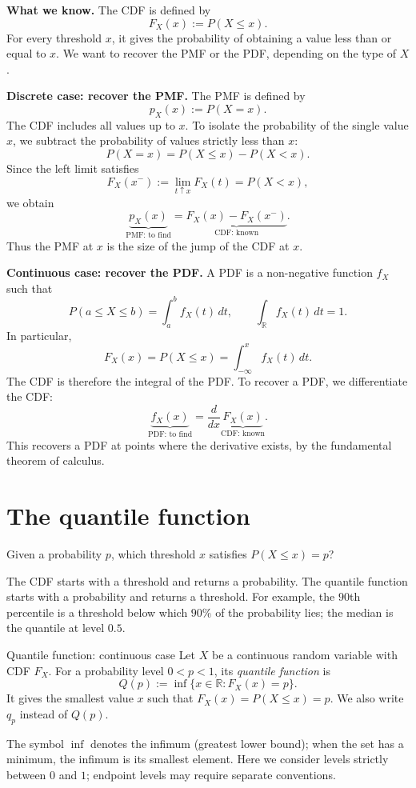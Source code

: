 \documentclass[a4paper,12pt,oneside]{report}
\begin{document}
\textbf{What we know.} The CDF is defined by
\[
  F_X(x):=P(X\leq x).
\]
For every threshold $x$, it gives the probability of obtaining a
value less than or equal to $x$. We want to recover the PMF or the
PDF, depending on the type of $X$.

\textbf{Discrete case: recover the PMF.}
The PMF is defined by
\[
  p_X(x):=P(X=x).
\]
The CDF includes all values up to $x$. To isolate the probability
of the single value $x$, we subtract the probability of values
strictly less than $x$:
\[
  P(X=x)=P(X\leq x)-P(X<x).
\]
Since the left limit satisfies
\[
  F_X(x^-):=\lim_{t\uparrow x}F_X(t)=P(X<x),
\]
we obtain
\[
  \boxed{\underbrace{p_X(x)}_{\text{PMF: to find}}
    =\underbrace{F_X(x)-F_X(x^-)}_{\text{CDF: known}}.}
\]
Thus the PMF at $x$ is the size of the jump of the CDF at $x$.

\label{rel:cdf-to-pdf}
\textbf{Continuous case: recover the PDF.}
A PDF is a non-negative function $f_X$ such that
\[
  P(a\leq X\leq b)=\int_a^b f_X(t)\,dt,
  \qquad \int_{\mathbb R}f_X(t)\,dt=1.
\]
In particular,
\[
  F_X(x)=P(X\leq x)=\int_{-\infty}^{x}f_X(t)\,dt.
\]
The CDF is therefore the integral of the PDF. To recover a PDF,
we differentiate the CDF:
\[
  \boxed{\underbrace{f_X(x)}_{\text{PDF: to find}}
    =\frac{d}{dx}\underbrace{F_X(x)}_{\text{CDF: known}}.}
\]
This recovers a PDF at points where the derivative exists, by the
fundamental theorem of calculus.

\clearpage
\section{The quantile function}
\begin{tcolorbox}[colback=blue!3,colframe=blue!30!black,
  boxrule=0.4pt,arc=1mm,title={What we are trying to answer},
  colbacktitle=blue!10,coltitle=black,fonttitle=\bfseries]
Given a probability $p$, which threshold $x$ satisfies
$P(X\leq x)=p$?
\end{tcolorbox}
The CDF starts with a threshold and returns a probability. The
quantile function starts with a probability and returns a threshold.
For example, the $90$th percentile is a threshold below which
$90\%$ of the probability lies; the median is the quantile at level $0.5$.

\begin{frameddefn}{Quantile function: continuous case}
\label{def:quantile-continuous}
Let $X$ be a continuous random variable with CDF $F_X$. For a
probability level $0<p<1$, its \emph{quantile function} is
\[
  Q(p):=\inf\{x\in\mathbb R:F_X(x)=p\}.
\]
It gives the smallest value $x$ such that $F_X(x)=P(X\leq x)=p$.
We also write $q_p$ instead of $Q(p)$.
\end{frameddefn}
The symbol $\inf$ denotes the infimum (greatest lower bound);
when the set has a minimum, the infimum is its smallest element.
Here we consider levels strictly between $0$ and $1$; endpoint
levels may require separate conventions.
\end{document}
